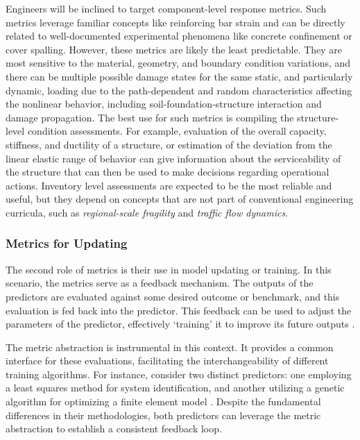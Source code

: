 Engineers will be inclined to target component-level response metrics.  
Such metrics leverage familiar concepts like reinforcing bar strain and can be directly related to well-documented experimental phenomena like concrete confinement or cover spalling.
However, these metrics are likely the least predictable. 
They are most sensitive to the material, geometry, and boundary condition variations, and there can be multiple possible damage states for the same static, and particularly dynamic, loading due to the path-dependent and random characteristics affecting the nonlinear behavior, including soil-foundation-structure interaction and damage propagation. %
The best use for such metrics is compiling the structure-level condition assessments. For example, evaluation of the overall capacity, stiffness, and ductility of a structure, or estimation of the deviation from the linear elastic range of behavior can give information about the serviceability of the structure that can then be used to make decisions regarding operational actions. Inventory level assessments are expected to be the most reliable and useful, but they depend on concepts that are not part of conventional engineering curricula, such as \emph{regional-scale fragility} and \emph{traffic flow dynamics}.
\fi

\subsubsection{Metrics for Updating}
The second role of metrics is their use in model updating or training. In this scenario, the metrics serve as a feedback mechanism. The outputs of the \glspl{predictor} are evaluated against some desired outcome or benchmark, and this evaluation is fed back into the \gls{predictor}. 
This feedback can be used to adjust the parameters of the \gls{predictor}, effectively ‘training’ it to improve its future outputs \citep{torzoni2024digital,ereiz2022review,ghahari2022bridge}.

The \gls{metric} abstraction is instrumental in this context. It provides a common interface for these evaluations, facilitating the interchangeability of different training algorithms. For instance, consider two distinct \glspl{predictor}: one employing a least squares method for system identification, and another utilizing a genetic algorithm for optimizing a finite element model \citep{gomez-cabrera2022review}. 
Despite the fundamental differences in their methodologies, both \glspl{predictor} can leverage the \gls{metric} abstraction to establish a consistent feedback loop.

